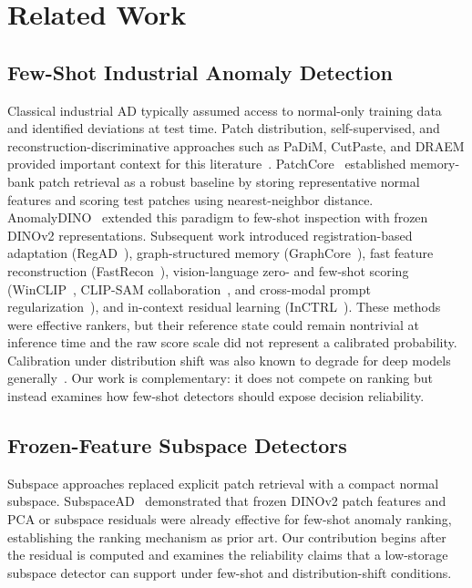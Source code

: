 \section{Related Work}\label{sec:related}
\subsection{Few-Shot Industrial Anomaly Detection}
Classical industrial AD typically assumed access to normal-only training data and identified deviations at test time. Patch distribution, self-supervised, and reconstruction-discriminative approaches such as PaDiM, CutPaste, and DRAEM provided important context for this literature~\cite{padim2021,cutpaste2021,draem2021}. PatchCore~\cite{roth2022towards} established memory-bank patch retrieval as a robust baseline by storing representative normal features and scoring test patches using nearest-neighbor distance. AnomalyDINO~\cite{damm2025anomalydino} extended this paradigm to few-shot inspection with frozen DINOv2 representations. Subsequent work introduced registration-based adaptation (RegAD~\cite{regad2022}), graph-structured memory (GraphCore~\cite{graphcore2023}), fast feature reconstruction (FastRecon~\cite{fastrecon2023}), vision-language zero- and few-shot scoring (WinCLIP~\cite{winclip2023}, CLIP-SAM collaboration~\cite{clipsam2025}, and cross-modal prompt regularization~\cite{uniadprompt2026}), and in-context residual learning (InCTRL~\cite{inctrl2024}). These methods were effective rankers, but their reference state could remain nontrivial at inference time and the raw score scale did not represent a calibrated probability. Calibration under distribution shift was also known to degrade for deep models generally~\cite{ovadia2019trust}. Our work is complementary: it does not compete on ranking but instead examines how few-shot detectors should expose decision reliability.

\subsection{Frozen-Feature Subspace Detectors}
Subspace approaches replaced explicit patch retrieval with a compact normal subspace. SubspaceAD~\cite{subspacead2026} demonstrated that frozen DINOv2 patch features and PCA or subspace residuals were already effective for few-shot anomaly ranking, establishing the ranking mechanism as prior art. Our contribution begins after the residual is computed and examines the reliability claims that a low-storage subspace detector can support under few-shot and distribution-shift conditions.


